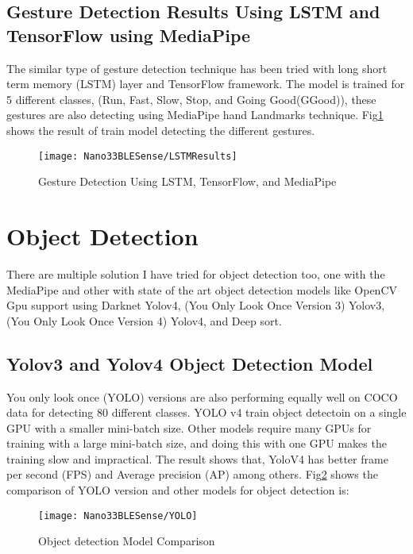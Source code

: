 \subsection{Gesture Detection Results Using LSTM and TensorFlow using MediaPipe}

The similar type of gesture detection technique has been tried with long short term memory (LSTM) layer and TensorFlow framework. The model is trained for 5 different classes, (Run, Fast, Slow, Stop, and Going Good(GGood)), these gestures are also detecting using MediaPipe hand Landmarks technique. Fig\ref{Gesture Detection Using LSTM, TensorFlow, and MediaPipe} shows the result of train model detecting the different gestures.

\begin{figure}[h]
	\centering
	\texttt{[image: Nano33BLESense/LSTMResults]}
	\caption{Gesture Detection Using LSTM, TensorFlow, and MediaPipe}
	\label{Gesture Detection Using LSTM, TensorFlow, and MediaPipe}
\end{figure}

\section {Object Detection}

There are multiple solution I have tried for object detection too, one with the MediaPipe and other with state of the art object detection models like OpenCV Gpu support using Darknet Yolov4, (You Only Look Once Version 3) Yolov3, (You Only Look Once Version 4) Yolov4, and Deep sort. 

\subsection{Yolov3 and Yolov4 Object Detection Model}

You only look once (YOLO) versions are also performing equally well on COCO data for detecting 80 different classes. YOLO v4 train object detectoin on a single GPU with a smaller mini-batch size. Other models require many GPUs for training with a large mini-batch size, and doing this with one GPU makes the training slow and impractical. The result shows that, YoloV4 has better frame per second (FPS) and Average precision (AP) among others. Fig\ref{Object detection Model Comparison} shows the comparison of YOLO version and other models for object detection is:

\begin{figure}[h]
	\centering
	\texttt{[image: Nano33BLESense/YOLO]}
	\caption{Object detection Model Comparison}
	\label{Object detection Model Comparison}
\end{figure}


